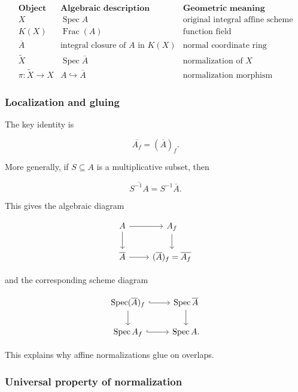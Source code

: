 \documentclass[12pt,a4paper]{article}
\theoremstyle{notespace}
\begin{document}
\[
\begin{array}{c|c|c}
	\textbf{Object} & \textbf{Algebraic description} & \textbf{Geometric meaning} \\
	\hline
	X
	&
	\operatorname{Spec}A
	&
	\text{original integral affine scheme}
	\\
	\hline
	K(X)
	&
	\operatorname{Frac}(A)
	&
	\text{function field}
	\\
	\hline
	\overline{A}
	&
	\text{integral closure of }A\text{ in }K(X)
	&
	\text{normal coordinate ring}
	\\
	\hline
	\widetilde{X}
	&
	\operatorname{Spec}\overline{A}
	&
	\text{normalization of }X
	\\
	\hline
	\pi:\widetilde{X}\to X
	&
	A\hookrightarrow \overline{A}
	&
	\text{normalization morphism}
\end{array}
\]

\subsubsection{Localization and gluing}

The key identity is

\[
\overline{A_f}=(\overline{A})_f.
\]

More generally, if \(S\subseteq A\) is a multiplicative subset, then

\[
\overline{S^{-1}A}=S^{-1}\overline{A}.
\]

This gives the algebraic diagram

\[
\begin{tikzcd}
	A \arrow[r] \arrow[d]
	&
	A_f \arrow[d]
	\\
	\overline{A} \arrow[r]
	&
	(\overline{A})_f=\overline{A_f}
\end{tikzcd}
\]

and the corresponding scheme diagram

\[
\begin{tikzcd}
	\operatorname{Spec}(\overline{A})_f \arrow[r,hook] \arrow[d]
	&
	\operatorname{Spec}\overline{A} \arrow[d]
	\\
	\operatorname{Spec}A_f \arrow[r,hook]
	&
	\operatorname{Spec}A.
\end{tikzcd}
\]

This explains why affine normalizations glue on overlaps.

\subsubsection{Universal property of normalization}
\end{document}
